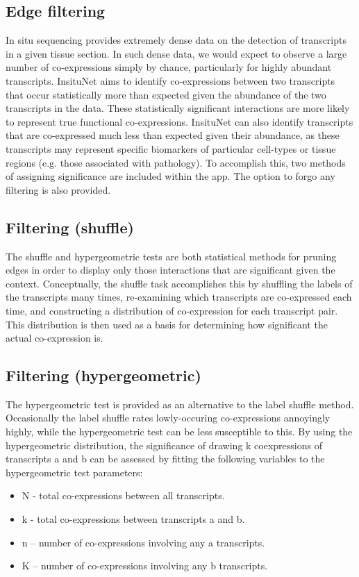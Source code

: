 \documentclass[a4paper,12pt]{article}
\begin{document}
\subsection{Edge filtering} \label{filtering}

In situ sequencing provides extremely dense data on the detection of transcripts in a given tissue section. In such dense data, we would expect to observe a large number of co-expressions simply by chance, particularly for highly abundant transcripts. InsituNet aims to identify co-expressions between two transcripts that occur statistically more than expected given the abundance of the two transcripts in the data. These statistically significant interactions are more likely to represent true functional co-expressions. InsituNet can also identify transcripts that are co-expressed much less than expected given their abundance, as these transcripts may represent specific biomarkers of particular cell-types or tissue regions (e.g. those associated with pathology). To accomplish this, two methods of assigning significance are included within the app. The option to forgo any filtering is also provided.


\subsection{Filtering (shuffle)}
The shuffle and hypergeometric tests are both statistical methods for pruning edges in order to display only those interactions that are significant given the context. Conceptually, the shuffle task accomplishes this by shuffling the labels of the transcripts many times, re-examining which transcripts are co-expressed each time, and constructing a distribution of co-expression for each transcript pair. This distribution is then used as a basis for determining how significant the actual co-expression is.

\subsection{Filtering (hypergeometric)}
The hypergeometric test is provided as an alternative to the label shuffle method. Occasionally the label shuffle rates lowly-occuring co-expressions annoyingly highly, while the hypergeometric test can be less susceptible to this.
By using the hypergeometric distribution, the significance of drawing k coexpressions
of transcripts a and b can be assessed by fitting the following variables to the
hypergeometric test parameters:
\begin{itemize}
\item N - total co-expressions between all transcripts.
\item k - total co-expressions between transcripts a and b.
\item n – number of co-expressions involving any a transcripts.
\item K – number of co-expressions involving any b transcripts.
\end{itemize}
\end{document}
